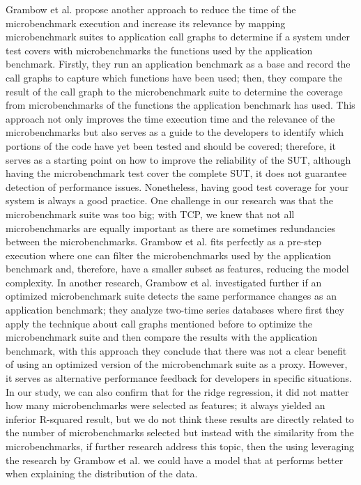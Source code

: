 Grambow et al. \cite{grambow2021usingApplication} propose another approach to reduce the time of the microbenchmark execution and increase its relevance by mapping microbenchmark suites to application call graphs to determine if a system under test covers with microbenchmarks the functions used by the application benchmark. Firstly, they run an application benchmark as a base and record the call graphs to capture which functions have been used; then, they compare the result of the call graph to the microbenchmark suite to determine the coverage from microbenchmarks of the functions the application benchmark has used. This approach not only improves the time execution time and the relevance of the microbenchmarks but also serves as a guide to the developers to identify which portions of the code have yet been tested and should be covered; therefore, it serves as a starting point on how to improve the reliability of the \ac{SUT}, although having the microbenchmark test cover the complete \ac{SUT}, it does not guarantee detection of performance issues. Nonetheless, having good test coverage for your system is always a good practice. One challenge in our research was that the microbenchmark suite was too big; with \ac{TCP}, we knew that not all microbenchmarks are equally important as there are sometimes redundancies between the microbenchmarks. Grambow et al. \cite{grambow2021usingApplication} fits perfectly as a pre-step execution where one can filter the microbenchmarks used by the application benchmark and, therefore, have a smaller subset as features, reducing the model complexity. In another research, Grambow et al. \cite{grambow} investigated further if an optimized microbenchmark suite detects the same performance changes as an application benchmark; they analyze two-time series databases where first they apply the technique about call graphs mentioned before to optimize the microbenchmark suite and then compare the results with the application benchmark, with this approach they conclude that there was not a clear benefit of using an optimized version of the microbenchmark suite as a proxy. However, it serves as alternative performance feedback for developers in specific situations. In our study, we can also confirm that for the ridge regression, it did not matter how many microbenchmarks were selected as features; it always yielded an inferior R-squared result, but we do not think these results are directly related to the number of microbenchmarks selected but instead with the similarity from the microbenchmarks, if further research address this topic, then the using leveraging the research by Grambow et al. \cite{grambow} we could have a model that at performs better when explaining the distribution of the data. \\

